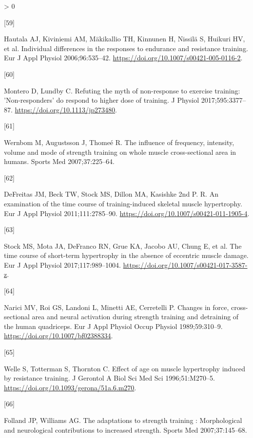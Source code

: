 \documentclass[twoside,10pt]{gihclass} %
\newlength{\cslhangindent}
\newlength{\csllabelwidth}
\newenvironment{CSLReferences}[3] %
 {%
  \setlength{\parindent}{0pt}
  \ifodd #1 \everypar{\setlength{\hangindent}{\cslhangindent}}\ignorespaces\fi
  \ifnum #2 > 0
  \setlength{\parskip}{#2\baselineskip}
  \fi
 }%
 {}
\newcommand{\CSLLeftMargin}[1]{\parbox[t]{\maxof{\widthof{#1}}{\csllabelwidth}}{#1}}
\newcommand{\CSLRightInline}[1]{\parbox[t]{\linewidth}{#1}}
\begin{document}
\begin{CSLReferences}{0}{0}
\leavevmode\hypertarget{ref-RN2681}{}%
\CSLLeftMargin{{[}59{]} }
\CSLRightInline{Hautala AJ, Kiviniemi AM, Mäkikallio TH, Kinnunen H, Nissilä S, Huikuri HV, et al. Individual differences in the responses to endurance and resistance training. Eur J Appl Physiol 2006;96:535--42. \url{https://doi.org/10.1007/s00421-005-0116-2}.}

\leavevmode\hypertarget{ref-RN2699}{}%
\CSLLeftMargin{{[}60{]} }
\CSLRightInline{Montero D, Lundby C. Refuting the myth of non-response to exercise training: 'Non-responders' do respond to higher dose of training. J Physiol 2017;595:3377--87. \url{https://doi.org/10.1113/jp273480}.}

\leavevmode\hypertarget{ref-RN346}{}%
\CSLLeftMargin{{[}61{]} }
\CSLRightInline{Wernbom M, Augustsson J, Thomeé R. The influence of frequency, intensity, volume and mode of strength training on whole muscle cross-sectional area in humans. Sports Med 2007;37:225--64.}

\leavevmode\hypertarget{ref-RN1596}{}%
\CSLLeftMargin{{[}62{]} }
\CSLRightInline{DeFreitas JM, Beck TW, Stock MS, Dillon MA, Kasishke 2nd P. R. An examination of the time course of training-induced skeletal muscle hypertrophy. Eur J Appl Physiol 2011;111:2785--90. \url{https://doi.org/10.1007/s00421-011-1905-4}.}

\leavevmode\hypertarget{ref-RN2113}{}%
\CSLLeftMargin{{[}63{]} }
\CSLRightInline{Stock MS, Mota JA, DeFranco RN, Grue KA, Jacobo AU, Chung E, et al. The time course of short-term hypertrophy in the absence of eccentric muscle damage. Eur J Appl Physiol 2017;117:989--1004. \url{https://doi.org/10.1007/s00421-017-3587-z}.}

\leavevmode\hypertarget{ref-RN2736}{}%
\CSLLeftMargin{{[}64{]} }
\CSLRightInline{Narici MV, Roi GS, Landoni L, Minetti AE, Cerretelli P. Changes in force, cross-sectional area and neural activation during strength training and detraining of the human quadriceps. Eur J Appl Physiol Occup Physiol 1989;59:310--9. \url{https://doi.org/10.1007/bf02388334}.}

\leavevmode\hypertarget{ref-RN2739}{}%
\CSLLeftMargin{{[}65{]} }
\CSLRightInline{Welle S, Totterman S, Thornton C. Effect of age on muscle hypertrophy induced by resistance training. J Gerontol A Biol Sci Med Sci 1996;51:M270--5. \url{https://doi.org/10.1093/gerona/51a.6.m270}.}

\leavevmode\hypertarget{ref-RN767}{}%
\CSLLeftMargin{{[}66{]} }
\CSLRightInline{Folland JP, Williams AG. The adaptations to strength training : Morphological and neurological contributions to increased strength. Sports Med 2007;37:145--68.}


\end{CSLReferences}
\end{document}
